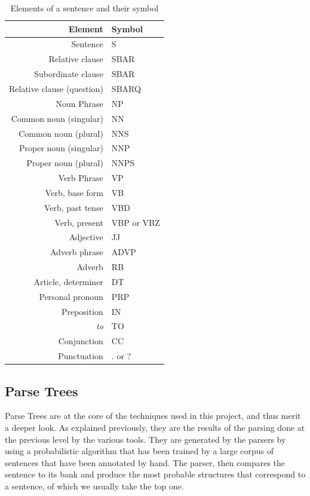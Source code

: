 \begin{table}[ht]
  \caption{Elements of a sentence and their symbol}
  \label{penntree_symbols}
  \begin{center}
  \begin{tabular}{r l}
  Element & Symbol\\
  \hline
  Sentence & S\\
  Relative clause & SBAR\\
  Subordinate clause & SBAR\\
  Relative clause (question) & SBARQ\\
  Noun Phrase & NP\\
  Common noun (singular) & NN\\
  Common noun (plural) & NNS\\
  Proper noun (singular) & NNP\\
  Proper noun (plural) & NNPS\\
  Verb Phrase & VP\\
  Verb, base form & VB\\
  Verb, past tense & VBD\\
  Verb, present & VBP or VBZ\\
  Adjective & JJ\\
  Adverb phrase & ADVP\\
  Adverb & RB\\
  Article, determiner & DT\\
  Personal pronoun & PRP\\
  Preposition & IN\\
  \emph{to} & TO\\
  Conjunction & CC\\
  Punctuation & . or ?\\
  \end{tabular}
  \end{center}
\end{table}


\subsection{Parse Trees} %
\label{sub:parse_trees}

Parse Trees are at the core of the techniques used in this project, and thus merit a deeper look. As explained previously, they are the results of the parsing done at the previous level by the various tools. They are generated by the parsers by using a probabilistic algorithm that has been trained by a large corpus of sentences that have been annotated by hand. The parser, then compares the sentence to its bank and produce the most probable structures that correspond to a sentence, of which we usually take the top one.

